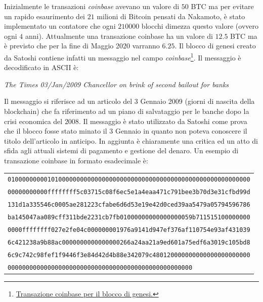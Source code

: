 Inizialmente le transazioni \textit{coinbase} avevano un valore di $50$ BTC ma per evitare un rapido esaurimento dei $21$ milioni di Bitcoin pensati da Nakamoto, è stato implementato un contatore che ogni $210000$ blocchi dimezza questo valore (ovvero ogni $4$ anni). Attualmente una transazione coinbase ha un valore di $12.5$ BTC ma è previsto che per la fine di Maggio 2020 varranno $6.25$.\newline
Il blocco di genesi creato da Satoshi contiene infatti un messaggio nel campo \textit{coinbase}\footnote{\href{https://www.blockchain.com/btc/tx/4a5e1e4baab89f3a32518a88c31bc87f618f76673e2cc77ab2127b7afdeda33b?show\_adv=true}{Transazione coinbase per il blocco di genesi.}}.\newline
Il messaggio è decodificato in ASCII è:
\begin{center}
\item \textit{The Times 03/Jan/2009 Chancellor on brink of second bailout for banks}
\end{center}
Il messaggio si riferisce ad un articolo del 3 Gennaio 2009 (giorni di nascita della blockchain) che fa riferimento ad un piano di salvataggio per le banche dopo la crisi economica del $2008$. Il messaggio è stato utilizzato da Satoshi come prova che il blocco fosse stato minato il 3 Gennaio in quanto non poteva conoscere il titolo dell'articolo in anticipo. In aggiunta è chiaramente una critica ed un atto di sfida agli attuali sistemi di pagamento e gestione del denaro.
Un esempio di transazione coinbase in formato esadecimale è:
\begin{table}[H]
    \begin{tabular}{l}
        \texttt{0100000000010100000000000000000000000000000000000000000000000000000}\\
        \texttt{00000000000ffffffff5c03715c08f6ec5e1a4eaa471c791bee3b70d3e31cfbd99d}\\
        \texttt{131d1a335546c0005ae281223cfabe6d6d53e19e42d0ced39aa5479a05794596786}\\
        \texttt{ba145047aa089cff311bde2231cb7fb01000000000000000059b711515100000000}\\
        \texttt{0000ffffffff027e2fe04c000000001976a9141d947ef376af110754e93af431039}\\
        \texttt{6c421238a9b88ac0000000000000000266a24aa21a9ed601a75edf6a3019c105bd8}\\
        \texttt{6c9c742c98fef1f9446f3e84d42d4b88e342079c480120000000000000000000000}\\
        \texttt{000000000000000000000000000000000000000000000000000}
    \end{tabular}
\end{table}

